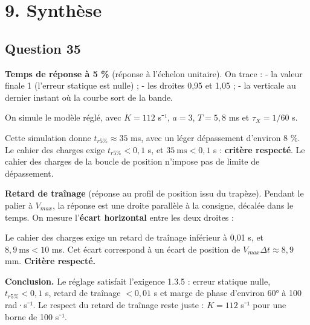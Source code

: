 \documentclass[11pt,a4paper]{article}
\newcommand{\equationajustee}[1]{%
  \sbox{\boiteequation}{$\displaystyle #1$}%
  \ifdim\wd\boiteequation>\linewidth
    \[\resizebox{\linewidth}{!}{\usebox{\boiteequation}}\]%
  \else
    \[#1\]%
  \fi}
\begin{document}
\hypertarget{synthuxe8se}{%
\section{9. Synthèse}\label{synthuxe8se}}

\hypertarget{question-35}{%
\subsection{Question 35}\label{question-35}}

\textbf{Temps de réponse à 5 \%} (réponse à l'échelon unitaire). On trace :
- la valeur finale 1 (l'erreur statique est nulle) ;
- les droites 0,95 et 1,05 ;
- la verticale au dernier instant où la courbe sort de la bande.

On simule le modèle réglé, avec \(K = 112\) s⁻¹, \(a = 3\), \(T = 5{,}8\) ms et \(\tau_X = 1/60\) s.

Cette simulation donne \(t_{r5\%}\approx 35\) ms, avec un léger dépassement d'environ 8 \%. Le cahier des charges exige \(t_{r5\%} < 0{,}1\) s, et \(35\ \text{ms} < 0{,}1\) s : \textbf{critère respecté}. Le cahier des charges de la boucle de position n'impose pas de limite de dépassement.

\textbf{Retard de traînage} (réponse au profil de position issu du trapèze). Pendant le palier à \(V_{max}\), la réponse est une droite parallèle à la consigne, décalée dans le temps. On mesure l'\textbf{écart horizontal} entre les deux droites :

\equationajustee{\Delta t = \frac1K \approx 8{,}9\ \text{ms}}

Le cahier des charges exige un retard de traînage inférieur à 0,01 s, et \(8{,}9\ \text{ms} < 10\) ms. Cet écart correspond à un écart de position de \(V_{max}\Delta t\approx 8{,}9\) mm. \textbf{Critère respecté.}

\textbf{Conclusion.} Le réglage satisfait l'exigence 1.3.5 : erreur statique nulle, \(t_{r5\%} < 0{,}1\) s, retard de traînage \(< 0{,}01\) s et marge de phase d'environ 60° à 100 rad·s⁻¹. Le respect du retard de traînage reste juste : \(K = 112\) s⁻¹ pour une borne de 100 s⁻¹.
\end{document}

